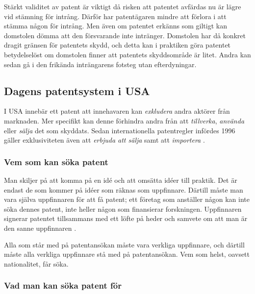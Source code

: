 
Stärkt validitet av patent är viktigt då risken att patentet avfärdas nu är lägre vid stämning för
intrång. Därför har patentägaren mindre att förlora i att stämma någon för intrång. Men
även om patentet erkänns som giltigt kan domstolen dömma att den försvarande inte intränger.
Domstolen har då konkret dragit gränsen för patentets skydd, och detta kan i praktiken göra patentet
betydelselöst om domstolen finner att patentets skyddsområde är litet. Andra kan sedan gå i den frikända
inträngarens fotsteg utan efterdyningar\cite{henry}.




\subsection{Dagens patentsystem i USA}

I USA innebär ett patent att innehavaren kan \emph{exkludera} andra aktörer från marknaden. Mer specifikt kan denne förhindra andra från att \emph{tillverka}, \emph{använda} eller \emph{sälja} det som skyddats. Sedan internationella patentregler infördes 1996 gäller exklusiviteten även att \emph{erbjuda att sälja} samt att \emph{importera} \cite{cmu-overview}.


\subsubsection{Vem som kan söka patent}

Man skiljer på att komma på en idé och att omsätta idéer till praktik. Det är endast de som kommer på idéer som räknas som uppfinnare. Därtill måste man vara själva uppfinnaren för att få patent; ett företag som anställer någon kan inte söka dennes patent, inte heller någon som finansierar forskningen. Uppfinnaren signerar patentet tillsammans med ett löfte på heder och samvete om att man är den sanne uppfinnaren \cite{cmu-overview}.

Alla som står med på patentansökan måste vara verkliga uppfinnare, och därtill måste alla verkliga uppfinnare stå med på patentansökan. Vem som helst, oavsett nationalitet, får söka.


\subsubsection{Vad man kan söka patent för}

